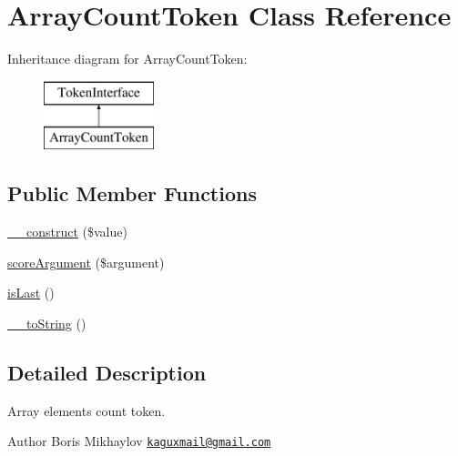 \hypertarget{class_prophecy_1_1_argument_1_1_token_1_1_array_count_token}{}\section{Array\+Count\+Token Class Reference}
\label{class_prophecy_1_1_argument_1_1_token_1_1_array_count_token}
Inheritance diagram for Array\+Count\+Token\+:\begin{figure}[H]
\begin{center}
\leavevmode
\includegraphics[height=2.000000cm]{class_prophecy_1_1_argument_1_1_token_1_1_array_count_token}
\end{center}
\end{figure}
\subsection*{Public Member Functions}
\begin{DoxyCompactItemize}
\item 
\mbox{\hyperlink{class_prophecy_1_1_argument_1_1_token_1_1_array_count_token_a7e17a19b592345a03763f050fffe0ce7}{\+\_\+\+\_\+construct}} (\$value)
\item 
\mbox{\hyperlink{class_prophecy_1_1_argument_1_1_token_1_1_array_count_token_a8d5bf47ab6eaa935458d5ad160e52822}{score\+Argument}} (\$argument)
\item 
\mbox{\hyperlink{class_prophecy_1_1_argument_1_1_token_1_1_array_count_token_ac72b8349b1340887fc1af30eca2b951c}{is\+Last}} ()
\item 
\mbox{\hyperlink{class_prophecy_1_1_argument_1_1_token_1_1_array_count_token_a7516ca30af0db3cdbf9a7739b48ce91d}{\+\_\+\+\_\+to\+String}} ()
\end{DoxyCompactItemize}


\subsection{Detailed Description}
Array elements count token.

\begin{DoxyAuthor}{Author}
Boris Mikhaylov \href{mailto:kaguxmail@gmail.com}{\tt kaguxmail@gmail.\+com} 
\end{DoxyAuthor}


